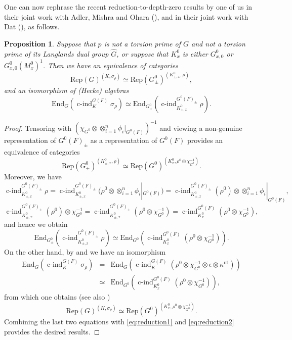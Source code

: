 \documentclass{article}
\def\hat{\widehat}
\newcommand{\eps}{\epsilon}
\DeclareMathOperator{\cind}{c-ind}
\newtheorem{pro}[thm]{Proposition}
\theoremstyle{definition}
\numberwithin{equation}{subsection}
\renewcommand{\-}{\hyp{}}
\begin{document}
One can now rephrase the recent reduction-to-depth-zero results by one of us in their joint work with Adler, Mishra and Ohara (\cite{AFMO2}), and in their joint work with Dat (\cite{DF}), as follows. \begin{pro}
	Suppose that $p$ is not a torsion prime of $G$ and not a torsion prime of its Langlands dual group $\hat G$, or suppose that $K^0_x$ is either $G^0_{x,0}$ or $G^0_{x,0}(M^0_x)^1$. 
	Then we have an equivalence of categories 
	\[\mathrm{Rep}(G)^{(K, \sigma_\rho)} \simeq \mathrm{Rep}(G^0_{\pm})^{(K^0_{\pm,x}, \rho)} ,\] 
	and an isomorphism of (Hecke) algebras 
	\[\mathrm{End}_G(\cind_K^{G(F)} \sigma_\rho) \simeq \mathrm{End}_{G^0_{\pm}}(\cind_{K^0_{\pm, x}}^{G^0(F)_{\pm}} \rho) .\]
\end{pro}
\begin{proof}
	Tensoring with $(\chi_{G^0}\otimes \otimes_{i=1}^n \phi_i|_{G^0(F)})^{-1}$ and viewing a non-genuine representation of $G^0(F)_{\pm}$ as a representation of $G^0(F)$ provides an equivalence of categories 
	\begin{equation} \label{eq:reduction1}
		\mathrm{Rep}(G^0_{\pm})^{(K^0_{\pm, x}, \rho)} \simeq  \mathrm{Rep}(G^0)^{(K^0_{x}, \rho^0 \otimes \chi_{G^0}^{-1})} .
		\end{equation}
	Moreover, we have 
	\[\cind_{K^0_{\pm, x}}^{G^0(F)_\pm} \rho=\cind_{K^0_{\pm, x}}^{G^0(F)_\pm}(\rho^0 \otimes \otimes_{i=1}^n \phi_i|_{G^0(F)})=\cind_{K^0_{\pm, x}}^{G^0(F)_\pm}(\rho^0) \otimes \otimes_{i=1}^n \phi_i|_{G^0(F)}, \]
	 \[\cind_{K^0_{\pm,x}}^{G^0(F)_{\pm}} (\rho^0) \otimes \chi_{G^0}^{-1} = \cind_{K^0_{\pm,x}}^{G^0(F)_{\pm}} (\rho^0 \otimes \chi_{G^0}^{-1}) = \cind_{K^0_{x}}^{G^0(F)}(\rho^0 \otimes \chi_{G^0}^{-1}) ,\]
	  and hence we obtain
	\begin{equation}\label{eq:reduction2}
		\mathrm{End}_{G^0_{\pm}}(\cind_{K^0_{\pm, x}}^{G^0(F)_\pm} \rho) \simeq \mathrm{End}_{G^0}(\cind_{K^0_{x}}^{G^0(F)}(\rho^0 \otimes \chi_{G^0}^{-1})) .
		 \end{equation}
	On the other hand, by \cite[Theorem~4.3.11]{AFMO2} and \cite[Corollary~4.1.2]{DF} we have an isomorphism
	\begin{eqnarray*}
		\mathrm{End}_G(\cind_K^{G(F)} \sigma_\rho)&=&\mathrm{End}_G(\cind_K^{G(F)}(\rho^0 \otimes \chi_{G^0}^{-1} \otimes \eps \otimes \kappa^{\mathrm{nt}}))\\
		&\simeq&\mathrm{End}_{G^0}(\cind_{K^0_{x}}^{G^0(F)} (\rho^0 \otimes \chi_{G^0}^{-1}) ),
	\end{eqnarray*}
	from which one obtains (see also \cite[Corallary~4.5.1]{AFMO2}) 
	\[\mathrm{Rep}(G)^{(K, \sigma_\rho)} \simeq \mathrm{Rep}(G^0)^{(K^0_{x}, \rho^0 \otimes \chi_{G^0}^{-1})} .\] 
	Combining the last two equations with \eqref{eq:reduction1} and \eqref{eq:reduction2} provides the desired results.
\end{proof}
\end{document}
